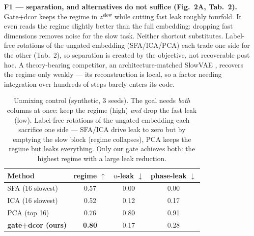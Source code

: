 \documentclass[10pt,twocolumn]{article}
\begin{document}
\textbf{F1 --- separation, and alternatives do not suffice (Fig.~2A, Tab.~2).}
Gate+dcor keeps the regime in $z^{\mathrm{slow}}$ while cutting fast leak
roughly fourfold. It even reads the regime slightly better than the full
embedding: dropping fast dimensions removes noise for the slow task. Neither
shortcut substitutes. Label-free rotations of the ungated embedding
(SFA/ICA/PCA) each trade one side for the other (Tab.~2), so separation is
created by the objective, not recoverable post hoc. A theory-bearing
competitor, an architecture-matched SlowVAE \cite{klindt2021towards}, recovers
the regime only weakly --- its reconstruction is local, so a factor needing
integration over hundreds of steps barely enters its code.

\begin{table}[t]
\centering\small
\caption{\small Unmixing control (synthetic, 3 seeds). The goal needs
\emph{both} columns at once: keep the regime (high) \emph{and} drop the fast
leak (low). Label-free rotations of the ungated embedding each sacrifice one
side --- SFA/ICA drive leak to zero but by emptying the slow block (regime
collapses), PCA keeps the regime but leaks everything. Only our gate achieves
both: the highest regime with a large leak reduction.}
\begin{tabular}{@{}lccc@{}}
\toprule
Method & regime $\uparrow$ & $u$-leak $\downarrow$ & phase-leak $\downarrow$\\
\midrule
SFA (16 slowest) & 0.57 & 0.00 & 0.00 \\
ICA (16 slowest) & 0.52 & 0.12 & 0.17 \\
PCA (top 16)     & 0.76 & 0.80 & 0.91 \\
\textbf{gate+dcor (ours)} & \textbf{0.80} & 0.17 & 0.28\\
\bottomrule
\end{tabular}
\end{table}
\end{document}
